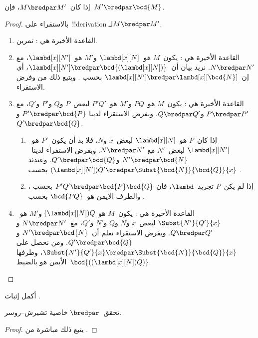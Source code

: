 \documentclass[../../../include/open-logic-section]{subfiles}
\begin{document}
\begin{lem}
  إذا كان~$M \bredpar M'$، فإن~$M' \bredpar \bcd{M}$.
\end{lem}
\begin{proof}
  بالاستقراء على~!!{derivation} لـ$M \bredpar M'$.
  \begin{enumerate}
    \item القاعدة الأخيرة هي : تمرين.
    \item القاعدة الأخيرة هي : يكون~$M$
      هو~$\lambd[x][N]$ و$M'$ هو~$\lambd[x][N']$، مع
      $N \bredpar N'$. نريد بيان أن~$\lambd[x][N'] \bredpar
      \bcd{(\lambd[x][N])}$، أي إن~$\lambd[x][N'] \bredpar
      \lambd[x][\bcd{N}]$ بحسب . ويتبع ذلك من
       وفرض الاستقراء.
    \item القاعدة الأخيرة هي : يكون~$M$ هو~$PQ$
      و$M'$ هو~$P'Q'$ لبعض~$P$ و$Q$ و$P'$ و$Q'$، مع
      $P \bredpar P'$ و$Q \bredpar Q'$. وبفرض الاستقراء لدينا
      $P' \bredpar \bcd{P}$ و$Q' \bredpar \bcd{Q}$.
      \begin{enumerate}
        \item إذا كان~$P$ هو~$\lambd[x][N]$ لبعض~$x$ و$N$، فلا بد
          أن يكون~$P'$ هو~$\lambd[x][N']$ لبعض~$N'$ مع
          $N \bredpar N'$. وبفرض الاستقراء لدينا~$N' \bredpar \bcd{N}$
          و$Q' \bredpar \bcd{Q}$. وعندئذ
          $(\lambd[x][N'])Q' \bredpar
          \Subst{\bcd{N}}{\bcd{Q}}{x}$ بحسب .
        \item إذا لم يكن~$P$ تجريد~$\lambd$، فإن
          $P'Q' \bredpar \bcd{P}\bcd{Q}$ بحسب ،
          والطرف الأيمن هو~$\bcd{PQ}$ بحسب .
      \end{enumerate}
    \item القاعدة الأخيرة هي : يكون~$M$ هو
      $(\lambd[x][N])Q$ و$M'$ هو~$\Subst{N'}{Q'}{x}$ لبعض~$x$ و$N$
      و$Q$ و$N'$ و$Q'$، مع~$N \bredpar N'$ و$Q \bredpar Q'$.
      وبفرض الاستقراء نعلم أن~$N' \bredpar \bcd{N}$ و
      $Q' \bredpar \bcd{Q}$. ومن  نحصل على
      $\Subst{N'}{Q'}{x} \bredpar \Subst{\bcd{N}}{\bcd{Q}}{x}$،
      وطرفها الأيمن هو بالضبط~$\bcd{((\lambd[x][N])Q)}$.
  \end{enumerate}
\end{proof}

\begin{prob}
  أكمل إثبات .
\end{prob}

\begin{thm}
  تحقق~$\bredpar$ خاصية تشيرش--روسر.
\end{thm}

\begin{proof}
  يتبع ذلك مباشرة من .
\end{proof}
\end{document}
